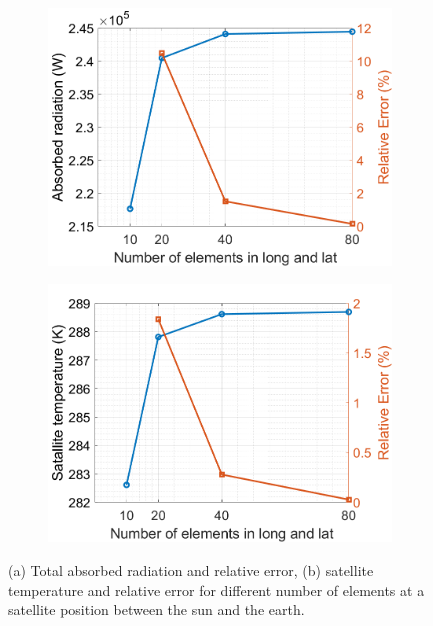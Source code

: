 \documentclass[11pt]{article}
\begin{document}
\begin{figure}[h]
    \centering
    \begin{subfigure}[b]{0.48\textwidth}
        \includegraphics[width = 0.8 \textwidth]{Matlab/Sensitivity/fig_Q_sensitivity_0_180.png}
        \caption{}
        \label{fig:ssa}    
    \end{subfigure}
    \begin{subfigure}[b]{0.48\textwidth}
        \includegraphics[width = 0.8 \textwidth]{Matlab/Sensitivity/fig_temp_sensitivity_0_180.png}
        \caption{}
        \label{fig:ssb}    
    \end{subfigure}
    \caption{(a) Total absorbed radiation and relative error, (b) satellite temperature and relative error for different number of elements at a satellite position between the sun and the earth.}
    \label{fig:ss}
\end{figure}
\end{document}
